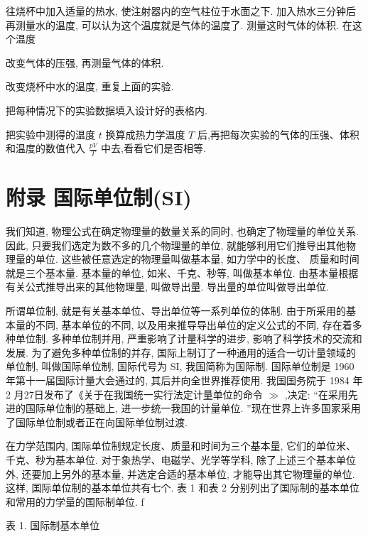 \documentclass[10pt]{article}
\begin{document}
往烧杯中加入适量的热水, 使注射器内的空气柱位于水面之下. 加入热水三分钟后再测量水的温度, 可以认为这个温度就是气体的温度了. 测量这时气体的体积. 在这个温度

改变气体的压强, 再测量气体的体积.

改变烧杯中水的温度, 重复上面的实验.

把每种情况下的实验数据填入设计好的表格内.

把实验中测得的温度 \(t\) 换算成热力学温度 \(T\) 后,再把每次实验的气体的压强、体积和温度的数值代入 \(\frac{pV}{T}\) 中去,看看它们是否相等.

\section*{附录 国际单位制(SI)}

我们知道, 物理公式在确定物理量的数量关系的同时, 也确定了物理量的单位关系. 因此, 只要我们选定为数不多的几个物理量的单位, 就能够利用它们推导出其他物理量的单位. 这些被任意选定的物理量叫做基本量, 如力学中的长度、 质量和时间就是三个基本量. 基本量的单位, 如米、千克、秒等, 叫做基本单位. 由基本量根据有关公式推导出来的其他物理量, 叫做导出量. 导出量的单位叫做导出单位.

所谓单位制, 就是有关基本单位、导出单位等一系列单位的体制. 由于所采用的基本量的不同, 基本单位的不同, 以及用来推导导出单位的定义公式的不同, 存在着多种单位制. 多种单位制并用, 严重影响了计量科学的进步, 影响了科学技术的交流和发展. 为了避免多种单位制的并存, 国际上制订了一种通用的适合一切计量领域的单位制, 叫做国际单位制, 国际代号为 SI, 我国简称为国际制. 国际单位制是 1960 年第十一届国际计量大会通过的, 其后并向全世界推荐使用. 我国国务院于 1984 年 2 月27日发布了《关于在我国统一实行法定计量单位的命令 \(\gg\) ,决定: “在采用先进的国际单位制的基础上, 进一步统一我国的计量单位. ”现在世界上许多国家采用了国际单位制或者正在向国际单位制过渡.

在力学范围内, 国际单位制规定长度、质量和时间为三个基本量, 它们的单位米、千克、秒为基本单位. 对于象热学、电磁学、光学等学科, 除了上述三个基本单位外, 还要加上另外的基本量, 并选定合适的基本单位, 才能导出其它物理量的单位. 这样, 国际单位制的基本单位共有七个. 表 1 和表 2 分别列出了国际制的基本单位和常用的力学量的国际制单位. f

表 1. 国际制基本单位

\begin{center}
\end{center}
\end{document}
